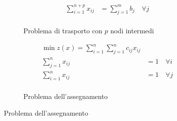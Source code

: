 \documentclass[\main/main.tex]{subfiles}
\begin{document}
\begin{figure}
\begin{subfigure}{0.45\textwidth}
\begin{align*}
			\sum_{i=1}^{n+p} x_{ij} & = \sum_{j=1}^m b_j    \quad \forall j \\
		\end{align*}
		\caption{Problema di trasporto con $p$ nodi intermedi}
	\end{subfigure}
	\begin{subfigure}{0.45\textwidth}
		\begin{align*}
			\min z(x) = \sum_{i=1}^n\sum_{j=1}^n c_{ij}x_{ij} \\
			\sum_{j=1}^n x_{ij} & = 1 \quad \forall i         \\
			\sum_{i=1}^n x_{ij} & = 1  \quad \forall j        \\
		\end{align*}
		\caption{Problema dell'assegnamento}
	\end{subfigure}
\end{figure}
\end{document}

